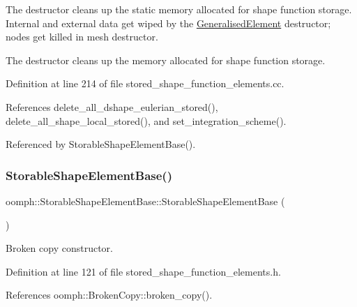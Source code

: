 The destructor cleans up the static memory allocated for shape function storage. Internal and external data get wiped by the \hyperlink{classoomph_1_1GeneralisedElement}{Generalised\+Element} destructor; nodes get killed in mesh destructor. 

The destructor cleans up the memory allocated for shape function storage. 

Definition at line 214 of file stored\+\_\+shape\+\_\+function\+\_\+elements.\+cc.



References delete\+\_\+all\+\_\+dshape\+\_\+eulerian\+\_\+stored(), delete\+\_\+all\+\_\+shape\+\_\+local\+\_\+stored(), and set\+\_\+integration\+\_\+scheme().



Referenced by Storable\+Shape\+Element\+Base().

\mbox{\label{classoomph_1_1StorableShapeElementBase_ae8d14ecd9aeb3956fda2001a5129b818}} 
\subsubsection{\texorpdfstring{Storable\+Shape\+Element\+Base()}{StorableShapeElementBase()}\hspace{0.1cm}{\footnotesize\ttfamily [2/2]}}
{\footnotesize\ttfamily oomph\+::\+Storable\+Shape\+Element\+Base\+::\+Storable\+Shape\+Element\+Base (\begin{DoxyParamCaption}\item[{const \hyperlink{classoomph_1_1StorableShapeElementBase}{Storable\+Shape\+Element\+Base} \&}]{ }\end{DoxyParamCaption})\hspace{0.3cm}{\ttfamily [inline]}}



Broken copy constructor. 



Definition at line 121 of file stored\+\_\+shape\+\_\+function\+\_\+elements.\+h.



References oomph\+::\+Broken\+Copy\+::broken\+\_\+copy().




